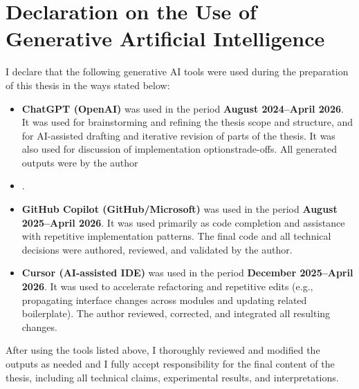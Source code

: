 \chapter*{Declaration on the Use of Generative Artificial Intelligence}

I declare that the following generative AI tools were used during the preparation of this thesis in the ways stated below:

\begin{itemize}
  \item \textbf{ChatGPT (OpenAI)} was used in the period \textbf{August 2024--April 2026}.
  It was used for brainstorming and refining the thesis scope and structure, and for AI-assisted drafting and iterative revision of \DIFdelbegin {}\DIFdelend \DIFaddbegin {}\DIFaddend parts of the thesis. It was also used for discussion of implementation options\DIFdelbegin {}\DIFdelend \DIFaddbegin {}\DIFaddend trade-offs\DIFaddbegin {}\DIFaddend . All generated outputs were \DIFdelbegin {}\DIFdelend \DIFaddbegin {}\DIFaddend by the author\DIFaddbegin {}

  \item \textbf{} \textbf{}\DIFaddend .

  \item \textbf{GitHub Copilot (GitHub/Microsoft)} was used in the period \textbf{August 2025--April 2026}.
  It was used primarily as code completion and assistance with repetitive implementation patterns. The final code and all technical decisions were authored, reviewed, and validated by the author.

  \item \textbf{Cursor (AI-assisted IDE)} was used in the period \textbf{December 2025--April 2026}.
  It was used to accelerate refactoring and repetitive edits (e.g., propagating interface changes across modules and updating related boilerplate). The author reviewed, corrected, and integrated all resulting changes.
\end{itemize}

After using the tools listed above, I thoroughly reviewed and modified the outputs as needed and I fully accept responsibility for the final content of the thesis, including all technical claims, experimental results, and interpretations.
